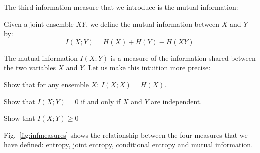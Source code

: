 
The third information measure that we introduce is the mutual information:
\begin{definition}
Given a joint ensemble $XY$, we define the mutual information between $X$ and $Y$ by:
\begin{equation*}
I(X;Y)=H(X) + H(Y) - H(XY)
\end{equation*}
\end{definition}
The mutual information $I({X};{Y})$ is a measure of the information shared between the two variables ${X}$ and ${Y}$. Let us make this intuition more precise:
\begin{exercise}
Show that for any ensemble $X$: $I(X;X)=H(X)$.
\end{exercise}
\begin{exercise}
Show that $I(X;Y)=0$ if and only if $X$ and $Y$ are independent. 
\end{exercise}
\begin{exercise}
Show that $I(X;Y)\geq 0$
\end{exercise}

Fig.~\ref{fig:infmeasures} shows the relationship between the four measures that we have defined: entropy, joint entropy, conditional entropy and mutual information.

